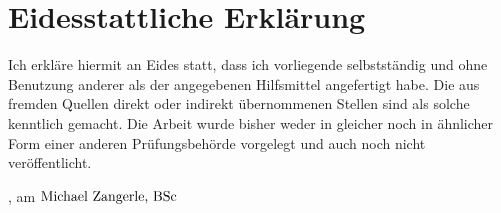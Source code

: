 \chapter*{Eidesstattliche Erklärung}
\thispagestyle{empty}
Ich erkläre hiermit an Eides statt, dass ich vorliegende \mykindofthesis{} selbstständig und ohne Benutzung anderer als der angegebenen Hilfsmittel angefertigt habe. Die aus fremden Quellen direkt oder indirekt übernommenen Stellen sind als solche kenntlich gemacht. Die Arbeit wurde bisher weder in gleicher noch in ähnlicher Form einer anderen Prüfungsbehörde vorgelegt und auch noch nicht veröffentlicht.

\vspace*{50mm}

\mysubmissiontown{}, am \mysubmissionday{} \mysubmissionmonth{} \mysubmissionyear{}\hfill${\hbox{Michael Zangerle, BSc{}}}$
